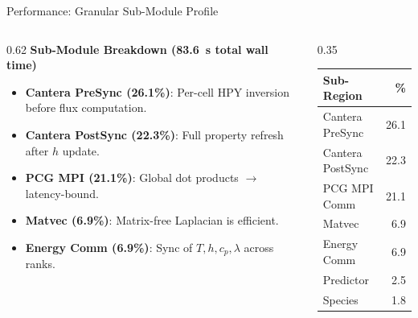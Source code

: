 \documentclass[aspectratio=169,11pt]{beamer}
\begin{document}
\begin{frame}{Performance: Granular Sub-Module Profile}
  \begin{columns}[T,totalwidth=\textwidth]
    \begin{column}{0.62\textwidth}
      \textbf{Sub-Module Breakdown (83.6~s total wall time)}
      \begin{itemize}
        \item \textbf{Cantera PreSync (26.1\%)}: Per-cell HPY inversion before flux computation.
        \item \textbf{Cantera PostSync (22.3\%)}: Full property refresh after $h$ update.
        \item \textbf{PCG MPI (21.1\%)}: Global dot products $\rightarrow$ latency-bound.
        \item \textbf{Matvec (6.9\%)}: Matrix-free Laplacian is efficient.
        \item \textbf{Energy Comm (6.9\%)}: Sync of $T, h, c_p, \lambda$ across ranks.
      \end{itemize}
    \end{column}

    \begin{column}{0.35\textwidth}
      \begin{tabular}{@{}lr@{}}
        \toprule
        \textbf{Sub-Region} & \textbf{\%} \\
        \midrule
        Cantera PreSync & 26.1 \\
        Cantera PostSync & 22.3 \\
        PCG MPI Comm & 21.1 \\
        Matvec & 6.9 \\
        Energy Comm & 6.9 \\
        Predictor & 2.5 \\
        Species & 1.8 \\
        \bottomrule
      \end{tabular}
    \end{column}
  \end{columns}
\end{frame}
\end{document}
